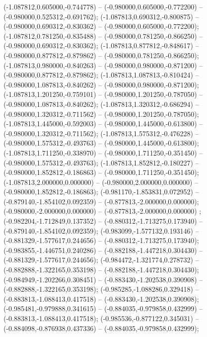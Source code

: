  (-1.087812,0.605000,-0.744778) -- (-0.980000,0.605000,-0.772200) -- (-0.980000,0.525312,-0.691762);
 (-1.087813,0.690312,-0.800875) -- (-0.980000,0.690312,-0.830362) -- (-0.980000,0.605000,-0.772200);
 (-1.087812,0.781250,-0.835488) -- (-0.980000,0.781250,-0.866250) -- (-0.980000,0.690312,-0.830362);
 (-1.087813,0.877812,-0.848617) -- (-0.980000,0.877812,-0.879862) -- (-0.980000,0.781250,-0.866250);
 (-1.087813,0.980000,-0.840263) -- (-0.980000,0.980000,-0.871200) -- (-0.980000,0.877812,-0.879862);
 (-1.087813,1.087813,-0.810424) -- (-0.980000,1.087813,-0.840262) -- (-0.980000,0.980000,-0.871200);
 (-1.087813,1.201250,-0.759101) -- (-0.980000,1.201250,-0.787050) -- (-0.980000,1.087813,-0.840262);
 (-1.087813,1.320312,-0.686294) -- (-0.980000,1.320312,-0.711562) -- (-0.980000,1.201250,-0.787050);
 (-1.087813,1.445000,-0.592003) -- (-0.980000,1.445000,-0.613800) -- (-0.980000,1.320312,-0.711562);
 (-1.087813,1.575312,-0.476228) -- (-0.980000,1.575312,-0.493763) -- (-0.980000,1.445000,-0.613800);
 (-1.087813,1.711250,-0.338970) -- (-0.980000,1.711250,-0.351450) -- (-0.980000,1.575312,-0.493763);
 (-1.087813,1.852812,-0.180227) -- (-0.980000,1.852812,-0.186863) -- (-0.980000,1.711250,-0.351450);
 (-1.087813,2.000000,0.000000) -- (-0.980000,2.000000,0.000000) -- (-0.980000,1.852812,-0.186863);
 (-0.981170,-1.853831,0.072952) -- (-0.879140,-1.854102,0.092359) -- (-0.877813,-2.000000,0.000000);
 (-0.980000,-2.000000,0.000000) -- (-0.877813,-2.000000,0.000000) ;
 (-0.982204,-1.712849,0.137352) -- (-0.880312,-1.713275,0.173940) -- (-0.879140,-1.854102,0.092359);
 (-0.983099,-1.577132,0.193146) -- (-0.881329,-1.577617,0.244656) -- (-0.880312,-1.713275,0.173940);
 (-0.983855,-1.446751,0.240286) -- (-0.882188,-1.447218,0.304430) -- (-0.881329,-1.577617,0.244656);
 (-0.984472,-1.321774,0.278732) -- (-0.882888,-1.322165,0.353198) -- (-0.882188,-1.447218,0.304430);
 (-0.984949,-1.202266,0.308451) -- (-0.883430,-1.202538,0.390908) -- (-0.882888,-1.322165,0.353198);
 (-0.985285,-1.088286,0.329418) -- (-0.883813,-1.088413,0.417518) -- (-0.883430,-1.202538,0.390908);
 (-0.985481,-0.979888,0.341615) -- (-0.884035,-0.979858,0.432999) -- (-0.883813,-1.088413,0.417518);
 (-0.985536,-0.877122,0.345031) -- (-0.884098,-0.876938,0.437336) -- (-0.884035,-0.979858,0.432999);

